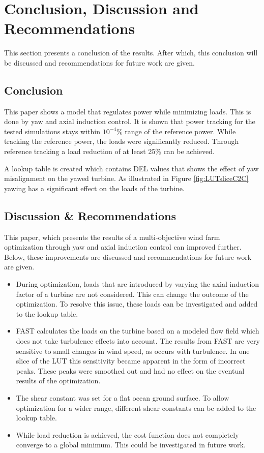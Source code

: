 \section{Conclusion, Discussion and Recommendations}
This section presents a conclusion of the results. After which, this conclusion will be discussed and recommendations for future work are given. 
\subsection{Conclusion}
This paper shows a model that regulates power while minimizing loads. This is done by yaw and axial induction control. It is shown that power tracking for the tested simulations stays within $10^{-4}\%$ range of the reference power. While tracking the reference power, the loads were significantly reduced.
Through reference tracking a load reduction of at least 25\% can be achieved.
 
A lookup table is created which contains DEL values that shows the effect of yaw misalignment on the yawed turbine. As illustrated in Figure \ref{fig:LUTsliceC2C} yawing has a significant effect on the loads of the turbine.

\subsection{Discussion \& Recommendations}
This paper, which presents the results of a multi-objective wind farm optimization through yaw and axial induction control can improved further. Below, these improvements are discussed and recommendations for future work are given.
\begin{itemize}
	\item During optimization, loads that are introduced by varying the axial induction factor of a turbine are not considered. This can change the outcome of the optimization. To resolve this issue, these loads can be investigated and added to the lookup table.
	\item FAST calculates the loads on the turbine based on a modeled flow field which does not take turbulence effects into account. The results from FAST are very sensitive to small changes in wind speed, as occurs with turbulence. In one slice of the LUT this sensitivity became apparent in the form of incorrect peaks. These peaks were smoothed out and had no effect on the eventual results of the optimization. 
	\item The shear constant was set for a flat ocean ground surface. To allow optimization for a wider range, different shear constants can be added to the lookup table.
	\item While load reduction is achieved, the cost function does not completely converge to a global minimum. This could be investigated in future work.
\end{itemize}

